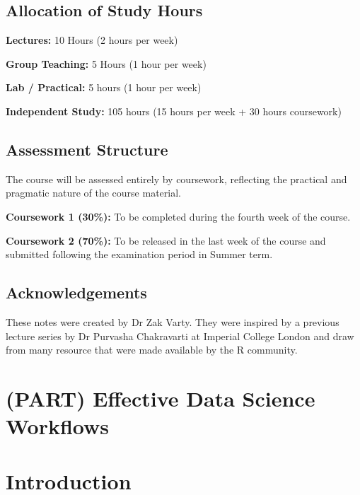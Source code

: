 \documentclass[
  12pt,
]{book}
\begin{document}
\hypertarget{allocation-of-study-hours}{%
\section*{Allocation of Study Hours}\label{allocation-of-study-hours}}

\textbf{Lectures:} 10 Hours (2 hours per week)

\textbf{Group Teaching:} 5 Hours (1 hour per week)

\textbf{Lab / Practical:} 5 hours (1 hour per week)

\textbf{Independent Study:} 105 hours (15 hours per week + 30 hours coursework)

\hypertarget{assessment-structure}{%
\section*{Assessment Structure}\label{assessment-structure}}

The course will be assessed entirely by coursework, reflecting the practical and pragmatic nature of the course material.

\textbf{Coursework 1 (30\%):} To be completed during the fourth week of the course.

\textbf{Coursework 2 (70\%):} To be released in the last week of the course and submitted following the examination period in Summer term.

\hypertarget{acknowledgements}{%
\section*{Acknowledgements}\label{acknowledgements}}

These notes were created by Dr Zak Varty. They were inspired by a previous lecture series by Dr Purvasha Chakravarti at Imperial College London and draw from many resource that were made available by the R community.

\hypertarget{part-effective-data-science-workflows}{%
\chapter{(PART) Effective Data Science Workflows}\label{part-effective-data-science-workflows}}

\hypertarget{workflows-introduction}{%
\chapter*{Introduction}\label{workflows-introduction}}
\end{document}
